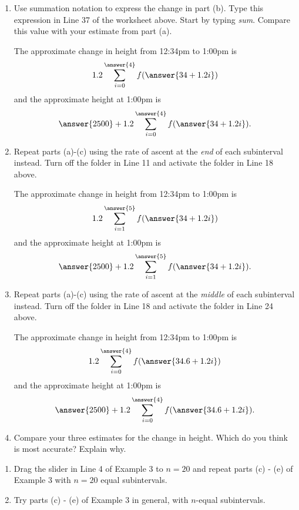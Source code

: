 \documentclass{ximera}
\begin{document}
\begin{example}
\begin{enumerate}
\item Use summation notation to express the change in part (b). Type this expression in Line 37 of the worksheet above. Start by typing \emph{sum}. Compare this value with your estimate from part (a).

The approximate change in height from 12:34pm to 1:00pm is
\[
  1.2 \sum_{i=0}^{\answer{4}} f(\answer{34 + 1.2i})  
\]
and the approximate height at 1:00pm is
\[
     \answer{2500} + 1.2 \sum_{i=0}^{\answer{4}} f(\answer{34 + 1.2i})  .
\]

\item Repeat parts (a)-(c) using the rate of ascent at the \emph{end} of each subinterval instead. Turn off the folder in Line 11 and activate the folder in Line 18 above.

The approximate change in height from 12:34pm to 1:00pm is
\[
  1.2 \sum_{i=1}^{\answer{5}} f(\answer{34 + 1.2i})  
\]
and the approximate height at 1:00pm is
\[
     \answer{2500} + 1.2 \sum_{i=1}^{\answer{5}} f(\answer{34 + 1.2i})  .
\]

\item Repeat parts (a)-(c) using the rate of ascent at the \emph{middle} of each subinterval instead. Turn off the folder in Line 18 and activate the folder in Line 24 above.

The approximate change in height from 12:34pm to 1:00pm is
\[
  1.2 \sum_{i=0}^{\answer{4}} f(\answer{34.6+ 1.2i})  
\]
and the approximate height at 1:00pm is
\[
     \answer{2500} + 1.2 \sum_{i=0}^{\answer{4}} f(\answer{34.6 + 1.2i})  .
\]

\item Compare your three estimates for the change in height. Which do you think is most accurate? Explain why.

\end{enumerate}
\end{example} 

\begin{example}  \label{Ex:IjdRJrehreDF}
\begin{enumerate}
\item  Drag the slider in Line 4 of Example 3 to $n=20$ and repeat parts (c) - (e) of Example 3 with $n=20$ equal subintervals. 

\item Try parts (c) - (e) of Example 3 in general, with $n$-equal subintervals.
\end{enumerate}
\end{example}
\end{document}
